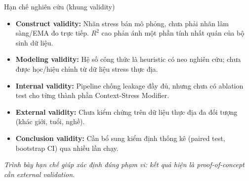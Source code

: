 \documentclass[11pt]{beamer}
\begin{document}
\begin{frame}{Hạn chế nghiên cứu (khung validity)}
\small
\begin{itemize}
    \item \textbf{Construct validity:} Nhãn stress bán mô phỏng, chưa phải nhãn lâm sàng/EMA đo trực tiếp. $R^2$ cao phản ánh một phần tính nhất quán của bộ sinh dữ liệu.

    \item \textbf{Modeling validity:} Hệ số công thức là heuristic có neo nghiên cứu; chưa được học/hiệu chỉnh từ dữ liệu stress thực địa.

    \item \textbf{Internal validity:} Pipeline chống leakage đầy đủ, nhưng chưa có ablation test cho từng thành phần Context-Stress Modifier.

    \item \textbf{External validity:} Chưa kiểm chứng trên dữ liệu thực địa đa đối tượng (khác giới, tuổi, nghề).

    \item \textbf{Conclusion validity:} Cần bổ sung kiểm định thống kê (paired test, bootstrap CI) qua nhiều lần chạy.
\end{itemize}

\vspace{0.1cm}
\textit{Trình bày hạn chế giúp xác định đúng phạm vi: kết quả hiện là proof-of-concept cần external validation.}
\end{frame}
\end{document}
